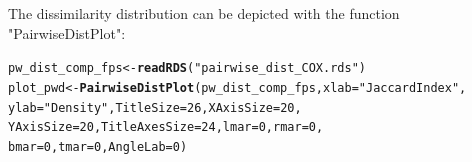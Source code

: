 \documentclass[twoside,a4wide,12pt]{article}\usepackage[]{graphicx}\usepackage[]{color}
\makeatletter
\newcommand{\hlnum}[1]{\textcolor[rgb]{0.686,0.059,0.569}{#1}}%
\newcommand{\hlstr}[1]{\textcolor[rgb]{0.192,0.494,0.8}{#1}}%
\newcommand{\hlstd}[1]{\textcolor[rgb]{0.345,0.345,0.345}{#1}}%
\newcommand{\hlkwb}[1]{\textcolor[rgb]{0.69,0.353,0.396}{#1}}%
\newcommand{\hlkwc}[1]{\textcolor[rgb]{0.333,0.667,0.333}{#1}}%
\newcommand{\hlkwd}[1]{\textcolor[rgb]{0.737,0.353,0.396}{\textbf{#1}}}%
\newenvironment{kframe}{%
 \def\at@end@of@kframe{}%
 \ifinner\ifhmode%
  \def\at@end@of@kframe{\end{minipage}}%
  \begin{minipage}{\columnwidth}%
 \fi\fi%
 \def\FrameCommand##1{\hskip\@totalleftmargin \hskip-\fboxsep
 \colorbox{shadecolor}{##1}\hskip-\fboxsep
     \hskip-\linewidth \hskip-\@totalleftmargin \hskip\columnwidth}%
 \MakeFramed {\advance\hsize-\width
   \@totalleftmargin\z@ \linewidth\hsize
   \@setminipage}}%
 {\par\unskip\endMakeFramed%
 \at@end@of@kframe}
\newenvironment{knitrout}{}{} %
\makeatother
\begin{document}
The dissimilarity distribution can be depicted with the function "PairwiseDistPlot": 
\begin{knitrout}
\color{fgcolor}\begin{kframe}
\begin{alltt}
\hlstd{pw_dist_comp_fps} \hlkwb{<-} \hlkwd{readRDS}\hlstd{(}\hlstr{"pairwise_dist_COX.rds"}\hlstd{)}
\hlstd{plot_pwd} \hlkwb{<-} \hlkwd{PairwiseDistPlot}\hlstd{(pw_dist_comp_fps,} \hlkwc{xlab} \hlstd{=} \hlstr{"Jaccard Index"}\hlstd{,}
    \hlkwc{ylab} \hlstd{=} \hlstr{"Density"}\hlstd{,} \hlkwc{TitleSize} \hlstd{=} \hlnum{26}\hlstd{,} \hlkwc{XAxisSize} \hlstd{=} \hlnum{20}\hlstd{,}
    \hlkwc{YAxisSize} \hlstd{=} \hlnum{20}\hlstd{,} \hlkwc{TitleAxesSize} \hlstd{=} \hlnum{24}\hlstd{,} \hlkwc{lmar} \hlstd{=} \hlnum{0}\hlstd{,} \hlkwc{rmar} \hlstd{=} \hlnum{0}\hlstd{,}
    \hlkwc{bmar} \hlstd{=} \hlnum{0}\hlstd{,} \hlkwc{tmar} \hlstd{=} \hlnum{0}\hlstd{,} \hlkwc{AngleLab} \hlstd{=} \hlnum{0}\hlstd{)}
\end{alltt}
\end{kframe}
\end{knitrout}
\end{document}
